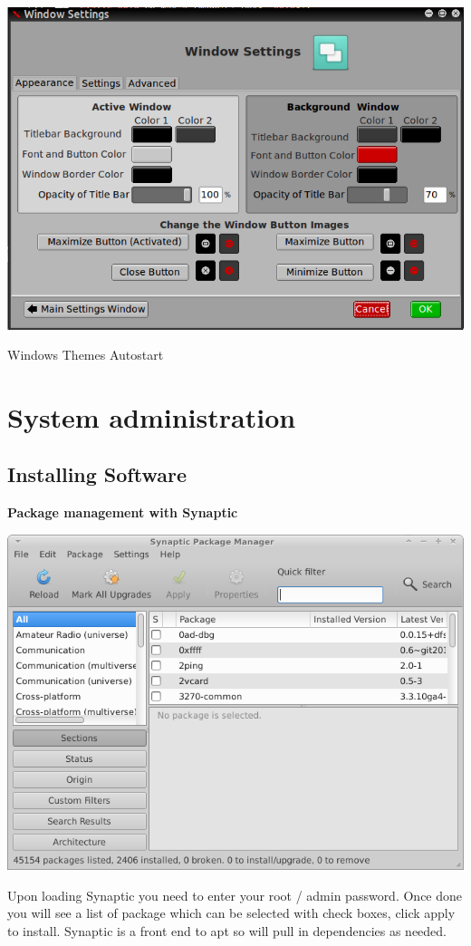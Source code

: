 \documentclass[12pt,a4paper]{book}
\begin{document}
\begin{center}
\includegraphics[width=0.7\linewidth]{screen-shots/window-settings}
\end{center}


{Windows}
{Themes}
{Autostart}


\newpage

\chapter{System administration}
\section{Installing Software}
\textbf{Package management with Synaptic}
\label{synaptic}

\includegraphics[width=0.8\linewidth]{screen-shots/synaptic1}

Upon loading Synaptic you need to enter your root / admin password.  Once done you will see a list of package which can be selected
with check boxes, click apply to install.  Synaptic is a front end to apt so will pull in dependencies as needed. 
\end{document}
